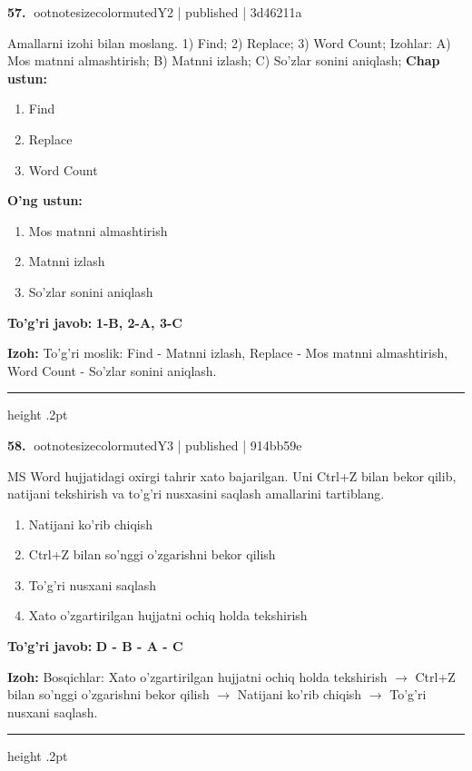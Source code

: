 \documentclass[10pt,a4paper]{article}
\begin{document}
\textbf{\color{ink}57.} {ootnotesizecolor{muted}Y2 | published | 3d46211a}
\par
Amallarni izohi bilan moslang.  1) Find;  2) Replace;  3) Word Count;  Izohlar: A) Mos matnni almashtirish;  B) Matnni izlash;  C) So'zlar sonini aniqlash;
\textbf{Chap ustun:}\begin{enumerate}[label=\arabic*),leftmargin=9mm]
\item Find
\item Replace
\item Word Count
\end{enumerate}
\textbf{O'ng ustun:}\begin{enumerate}[label=\Alph*),leftmargin=9mm]
\item Mos matnni almashtirish
\item Matnni izlash
\item So'zlar sonini aniqlash
\end{enumerate}
\begin{tcolorbox}[enhanced,breakable,colback=teal!4,colframe=teal!55!black,boxrule=0.45pt,arc=1.2mm,left=2.8mm,right=2.8mm,top=2mm,bottom=2mm]
\textbf{\color{teal}To'g'ri javob:} \textbf{1-B, 2-A, 3-C}
\par\smallskip
\textbf{Izoh:} To'g'ri moslik: Find - Matnni izlash, Replace - Mos matnni almashtirish, Word Count - So'zlar sonini aniqlash.
\end{tcolorbox}
\vspace{2mm}\hrule height .2pt\vspace{2mm}

\textbf{\color{ink}58.} {ootnotesizecolor{muted}Y3 | published | 914bb59e}
\par
MS Word hujjatidagi oxirgi tahrir xato bajarilgan. Uni Ctrl+Z bilan bekor qilib, natijani tekshirish va to'g'ri nusxasini saqlash amallarini tartiblang.
\begin{enumerate}[label=\Alph*),leftmargin=9mm]
\item Natijani ko'rib chiqish
\item Ctrl+Z bilan so'nggi o'zgarishni bekor qilish
\item To'g'ri nusxani saqlash
\item Xato o'zgartirilgan hujjatni ochiq holda tekshirish
\end{enumerate}
\begin{tcolorbox}[enhanced,breakable,colback=teal!4,colframe=teal!55!black,boxrule=0.45pt,arc=1.2mm,left=2.8mm,right=2.8mm,top=2mm,bottom=2mm]
\textbf{\color{teal}To'g'ri javob:} \textbf{D - B - A - C}
\par\smallskip
\textbf{Izoh:} Bosqichlar: Xato o'zgartirilgan hujjatni ochiq holda tekshirish \ensuremath{\rightarrow} Ctrl+Z bilan so'nggi o'zgarishni bekor qilish \ensuremath{\rightarrow} Natijani ko'rib chiqish \ensuremath{\rightarrow} To'g'ri nusxani saqlash.
\end{tcolorbox}
\vspace{2mm}\hrule height .2pt\vspace{2mm}
\end{document}
